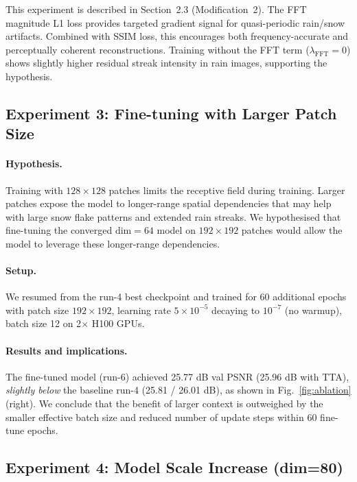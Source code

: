 \documentclass[runningheads]{llncs}
\begin{document}
This experiment is described in Section~2.3 (Modification~2).
The FFT magnitude L1 loss provides targeted gradient signal for quasi-periodic
rain/snow artifacts. Combined with SSIM loss, this encourages both
frequency-accurate and perceptually coherent reconstructions. Training without
the FFT term ($\lambda_{\text{FFT}}=0$) shows slightly higher residual streak
intensity in rain images, supporting the hypothesis.

\subsection{Experiment 3: Fine-tuning with Larger Patch Size}

\paragraph{Hypothesis.}
Training with $128\!\times\!128$ patches limits the receptive field during
training. Larger patches expose the model to longer-range spatial dependencies
that may help with large snow flake patterns and extended rain streaks. We
hypothesised that fine-tuning the converged dim$=64$ model on $192\!\times\!192$
patches would allow the model to leverage these longer-range dependencies.

\paragraph{Setup.}
We resumed from the run-4 best checkpoint and trained for 60 additional epochs
with patch size $192\!\times\!192$, learning rate $5\!\times\!10^{-5}$ decaying
to $10^{-7}$ (no warmup), batch size 12 on 2$\times$ H100 GPUs.

\paragraph{Results and implications.}
The fine-tuned model (run-6) achieved 25.77 dB val PSNR (25.96 dB with TTA),
\emph{slightly below} the baseline run-4 (25.81 / 26.01 dB), as shown in
Fig.~\ref{fig:ablation} (right). We conclude that the benefit of larger
context is outweighed by the smaller effective batch size and reduced number
of update steps within 60 fine-tune epochs.

\subsection{Experiment 4: Model Scale Increase (dim=80)}
\end{document}
